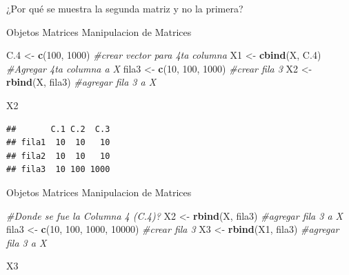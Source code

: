 \documentclass[
  ignorenonframetext,
]{beamer}
\newenvironment{Shaded}{\begin{snugshade}}{\end{snugshade}}
\newcommand{\CommentTok}[1]{\textcolor[rgb]{0.56,0.35,0.01}{\textit{#1}}}
\newcommand{\DecValTok}[1]{\textcolor[rgb]{0.00,0.00,0.81}{#1}}
\newcommand{\FloatTok}[1]{\textcolor[rgb]{0.00,0.00,0.81}{#1}}
\newcommand{\FunctionTok}[1]{\textcolor[rgb]{0.13,0.29,0.53}{\textbf{#1}}}
\newcommand{\NormalTok}[1]{#1}
\newcommand{\OtherTok}[1]{\textcolor[rgb]{0.56,0.35,0.01}{#1}}
\begin{document}
\begin{frame}[fragile]{¿Por qué se muestra la segunda matriz y no la
primera?}
\protect\hypertarget{por-quuxe9-se-muestra-la-segunda-matriz-y-no-la-primera}{}
\begin{block}{Objetos \textbar{} Matrices}
\protect\hypertarget{objetos-matrices-1}{}
Manipulacion de Matrices

\begin{Shaded}
\begin{Highlighting}[]
\NormalTok{C}\FloatTok{.4} \OtherTok{\textless{}{-}} \FunctionTok{c}\NormalTok{(}\DecValTok{100}\NormalTok{, }\DecValTok{1000}\NormalTok{) }\CommentTok{\#crear vector para 4ta columna }
\NormalTok{X1 }\OtherTok{\textless{}{-}} \FunctionTok{cbind}\NormalTok{(X, C}\FloatTok{.4}\NormalTok{) }\CommentTok{\#Agregar 4ta columna a X}
\NormalTok{fila3 }\OtherTok{\textless{}{-}} \FunctionTok{c}\NormalTok{(}\DecValTok{10}\NormalTok{, }\DecValTok{100}\NormalTok{, }\DecValTok{1000}\NormalTok{) }\CommentTok{\#crear fila 3}
\NormalTok{X2 }\OtherTok{\textless{}{-}} \FunctionTok{rbind}\NormalTok{(X, fila3) }\CommentTok{\#agregar fila 3 a X}

\NormalTok{X2}
\end{Highlighting}
\end{Shaded}

\begin{verbatim}
##       C.1 C.2  C.3
## fila1  10  10   10
## fila2  10  10   10
## fila3  10 100 1000
\end{verbatim}
\end{block}

\begin{block}{Objetos \textbar{} Matrices}
\protect\hypertarget{objetos-matrices-2}{}
Manipulacion de Matrices

\begin{Shaded}
\begin{Highlighting}[]
\CommentTok{\#Donde se fue la Columna 4 (C.4)?}
\NormalTok{X2 }\OtherTok{\textless{}{-}} \FunctionTok{rbind}\NormalTok{(X, fila3) }\CommentTok{\#agregar fila 3 a X}
\NormalTok{fila3 }\OtherTok{\textless{}{-}} \FunctionTok{c}\NormalTok{(}\DecValTok{10}\NormalTok{, }\DecValTok{100}\NormalTok{, }\DecValTok{1000}\NormalTok{, }\DecValTok{10000}\NormalTok{) }\CommentTok{\#crear fila 3}
\NormalTok{X3 }\OtherTok{\textless{}{-}} \FunctionTok{rbind}\NormalTok{(X1, fila3) }\CommentTok{\#agregar fila 3 a X}

\NormalTok{X3}
\end{Highlighting}
\end{Shaded}


\end{block}
\end{frame}
\end{document}
